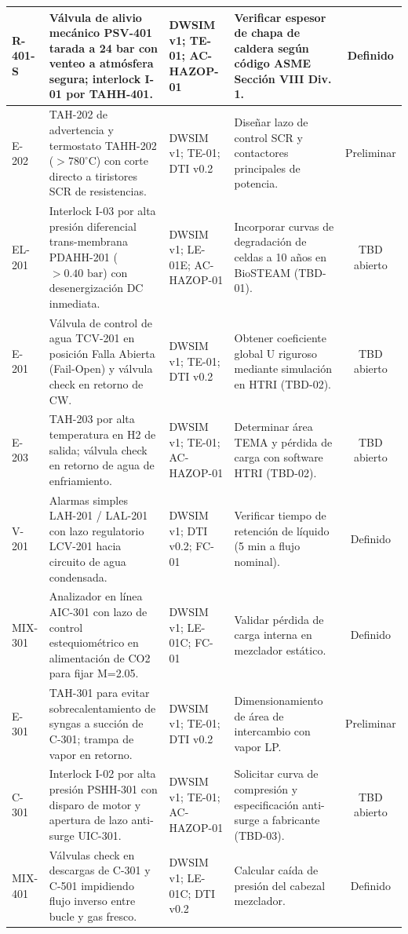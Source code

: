 \documentclass[10pt,letterpaper]{article}
\begin{document}
\begin{landscape}
\begin{xltabular}{\linewidth}{|l|p{6.0cm}|p{3.2cm}|p{4.2cm}|c|}
R-401-S & Válvula de alivio mecánico PSV-401 tarada a 24 bar con venteo a atmósfera segura; interlock I-01 por TAHH-401. & DWSIM v1; TE-01; AC-HAZOP-01 & Verificar espesor de chapa de caldera según código ASME Sección VIII Div. 1. & Definido \\ \hline
E-202 & TAH-202 de advertencia y termostato TAHH-202 ($>780^\circ\text{C}$) con corte directo a tiristores SCR de resistencias. & DWSIM v1; TE-01; DTI v0.2 & Diseñar lazo de control SCR y contactores principales de potencia. & Preliminar \\ \hline
EL-201 & Interlock I-03 por alta presión diferencial trans-membrana PDAHH-201 ($>0.40\text{ bar}$) con desenergización DC inmediata. & DWSIM v1; LE-01E; AC-HAZOP-01 & Incorporar curvas de degradación de celdas a 10 años en BioSTEAM (TBD-01). & TBD abierto \\ \hline
E-201 & Válvula de control de agua TCV-201 en posición Falla Abierta (Fail-Open) y válvula check en retorno de CW. & DWSIM v1; TE-01; DTI v0.2 & Obtener coeficiente global U riguroso mediante simulación en HTRI (TBD-02). & TBD abierto \\ \hline
E-203 & TAH-203 por alta temperatura en H2 de salida; válvula check en retorno de agua de enfriamiento. & DWSIM v1; TE-01; AC-HAZOP-01 & Determinar área TEMA y pérdida de carga con software HTRI (TBD-02). & TBD abierto \\ \hline
V-201 & Alarmas simples LAH-201 / LAL-201 con lazo regulatorio LCV-201 hacia circuito de agua condensada. & DWSIM v1; DTI v0.2; FC-01 & Verificar tiempo de retención de líquido (5 min a flujo nominal). & Definido \\ \hline
MIX-301 & Analizador en línea AIC-301 con lazo de control estequiométrico en alimentación de CO2 para fijar M=2.05. & DWSIM v1; LE-01C; FC-01 & Validar pérdida de carga interna en mezclador estático. & Definido \\ \hline
E-301 & TAH-301 para evitar sobrecalentamiento de syngas a succión de C-301; trampa de vapor en retorno. & DWSIM v1; TE-01; DTI v0.2 & Dimensionamiento de área de intercambio con vapor LP. & Preliminar \\ \hline
C-301 & Interlock I-02 por alta presión PSHH-301 con disparo de motor y apertura de lazo anti-surge UIC-301. & DWSIM v1; TE-01; AC-HAZOP-01 & Solicitar curva de compresión y especificación anti-surge a fabricante (TBD-03). & TBD abierto \\ \hline
MIX-401 & Válvulas check en descargas de C-301 y C-501 impidiendo flujo inverso entre bucle y gas fresco. & DWSIM v1; LE-01C; DTI v0.2 & Calcular caída de presión del cabezal mezclador. & Definido \\ \hline

\end{xltabular}
\end{landscape}
\end{document}
